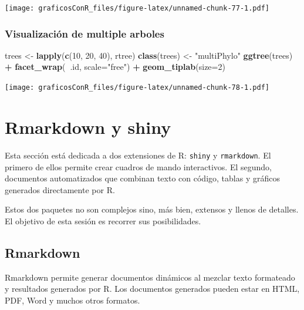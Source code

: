 \documentclass[]{article}
\newenvironment{Shaded}{\begin{snugshade}}{\end{snugshade}}
\newcommand{\DataTypeTok}[1]{\textcolor[rgb]{0.13,0.29,0.53}{#1}}
\newcommand{\DecValTok}[1]{\textcolor[rgb]{0.00,0.00,0.81}{#1}}
\newcommand{\KeywordTok}[1]{\textcolor[rgb]{0.13,0.29,0.53}{\textbf{#1}}}
\newcommand{\NormalTok}[1]{#1}
\newcommand{\OperatorTok}[1]{\textcolor[rgb]{0.81,0.36,0.00}{\textbf{#1}}}
\newcommand{\StringTok}[1]{\textcolor[rgb]{0.31,0.60,0.02}{#1}}
\numberwithin{ejcnt}{section}
\begin{document}
\texttt{[image: graficosConR\_files/figure-latex/unnamed-chunk-77-1.pdf]}

\hypertarget{visualizacion-de-multiple-arboles}{%
\subsubsection{Visualización de multiple arboles}\label{visualizacion-de-multiple-arboles}}

\begin{Shaded}
\begin{Highlighting}[]
\NormalTok{trees <-}\StringTok{ }\KeywordTok{lapply}\NormalTok{(}\KeywordTok{c}\NormalTok{(}\DecValTok{10}\NormalTok{, }\DecValTok{20}\NormalTok{, }\DecValTok{40}\NormalTok{), rtree)}
\KeywordTok{class}\NormalTok{(trees) <-}\StringTok{ "multiPhylo"}
\KeywordTok{ggtree}\NormalTok{(trees) }\OperatorTok{+}\StringTok{ }\KeywordTok{facet_wrap}\NormalTok{(}\OperatorTok{~}\NormalTok{.id, }\DataTypeTok{scale=}\StringTok{"free"}\NormalTok{) }\OperatorTok{+}\StringTok{ }\KeywordTok{geom_tiplab}\NormalTok{(}\DataTypeTok{size=}\DecValTok{2}\NormalTok{) }
\end{Highlighting}
\end{Shaded}

\texttt{[image: graficosConR\_files/figure-latex/unnamed-chunk-78-1.pdf]}

\hypertarget{rmarkdown-y-shiny}{%
\section{Rmarkdown y shiny}\label{rmarkdown-y-shiny}}

Esta sección está dedicada a dos extensiones de R: \texttt{shiny} y \texttt{rmarkdown}. El primero de ellos permite crear cuadros de mando interactivos. El segundo, documentos automatizados que combinan texto con código, tablas y gráficos generados directamente por R.

Estos dos paquetes no son complejos sino, más bien, extensos y llenos de detalles. El objetivo de esta sesión es recorrer sus posibilidades.

\hypertarget{rmarkdown}{%
\subsection{Rmarkdown}\label{rmarkdown}}

Rmarkdown permite generar documentos dinámicos al mezclar texto formateado y resultados generados por R. Los documentos generados pueden estar en HTML, PDF, Word y muchos otros formatos.
\end{document}
